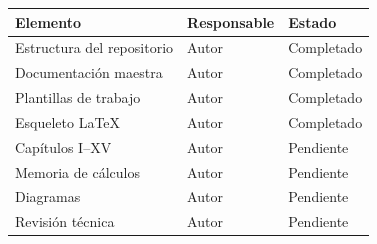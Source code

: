 \vspace{0.3cm}

\begin{table}[H]
  \centering
  \small
  \renewcommand{\arraystretch}{1.25}
  \begin{tabular}{@{}lll@{}}
    \toprule
    \textbf{Elemento} & \textbf{Responsable} & \textbf{Estado} \\
    \midrule
    Estructura del repositorio & Autor & Completado \\
    Documentación maestra & Autor & Completado \\
    Plantillas de trabajo & Autor & Completado \\
    Esqueleto LaTeX & Autor & Completado \\
    Capítulos I--XV & Autor & Pendiente \\
    Memoria de cálculos & Autor & Pendiente \\
    Diagramas & Autor & Pendiente \\
    Revisión técnica & Autor & Pendiente \\
    \bottomrule
  \end{tabular}
\end{table}

\cleardoublepage
